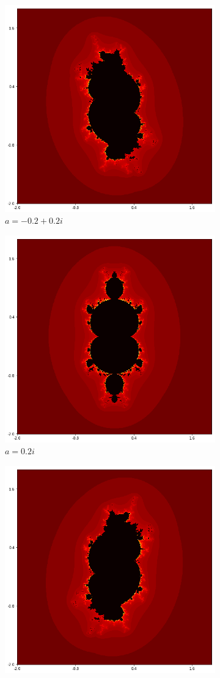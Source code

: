 \documentclass{amsart}
\theoremstyle{definition}
\theoremstyle{remark}
\numberwithin{equation}{section}
\begin{document}
\begin{figure}[h]
\centering
\begin{subfigure}{.32\textwidth}
  \centering
  \includegraphics[width=0.7\linewidth]{ShiftLocus3a1.png}
  \caption{$a=-0.2+0.2i$}
\end{subfigure}%
\begin{subfigure}{.32\textwidth}
  \centering
  \includegraphics[width=0.7\linewidth]{ShiftLocus3a2.png}
  \caption{$a=0.2i$}
\end{subfigure}
\begin{subfigure}{.32\textwidth}
  \centering
  \includegraphics[width=0.7\linewidth]{ShiftLocus3a3.png}

\end{subfigure}
\end{figure}
\end{document}
